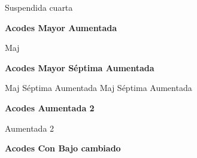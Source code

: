  Suspendida cuarta
\normalsize

\vskip 20pt
\textbf{Acodes Mayor Aumentada}
\vskip 25pt

\small
{} Maj
\normalsize

\vskip 20pt
\textbf{Acodes Mayor S\'eptima Aumentada}
\vskip 25pt

\small
{} Maj S\'eptima Aumentada
 Maj S\'eptima Aumentada
\normalsize

\vskip 20pt
\textbf{Acodes Aumentada 2}
\vskip 25pt

\small
{} Aumentada 2
\normalsize

\vskip 20pt
\textbf{Acodes Con Bajo cambiado}
\vskip 25pt

\small
{}
\vskip 20pt
\normalsize

\clearpage
\fi
%
